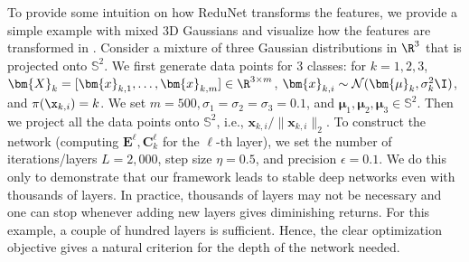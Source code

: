 \documentclass[../../book-main.tex]{subfiles}
\begin{document}
\begin{example}
To provide some intuition on how ReduNet transforms the features, we provide a simple example with mixed 3D Gaussians and visualize how the features are transformed in . 
Consider a mixture of three Gaussian distributions in $\R^{3}$ that is projected onto $\mathbb{S}^2$. We first generate data points for 3 classes: for $k=1,2,3$, $\bm{X}_{k}=[\bm{x}_{k,1}, \ldots, \bm{x}_{k,m}] \in \R^{3\times m}$, $\bm{x}_{k,i} \sim \mathcal{N}(\bm{\mu}_{k}, \sigma_{k}^{2} \I)$, and ${\pi}(\x_{k,i}) = k$.
We set $m=500, \sigma_{1}=\sigma_{2}=\sigma_{3}=0.1$, and $\bm{\mu}_{1}, \bm{\mu}_{2}, \bm{\mu}_{3} \in \mathbb{S}^2$. 
Then we project all the data points onto $\mathbb{S}^{2}$, i.e., $\bm{x}_{k,i}/\|\bm{x}_{k,i}\|_{2}$. 
To construct the network (computing $\bm{E}^{\ell}, \bm{C}^{\ell}_{k}$ for the $\ell$-th layer), we set the number of iterations/layers $L=2,000$, step size $\eta=0.5$, and precision $\epsilon=0.1$. 
We do this only to demonstrate that our framework leads to stable deep networks even with thousands of layers. 
In practice, thousands of layers may not be necessary and one can stop whenever adding new layers gives diminishing returns. 
For this example, a couple of hundred layers is sufficient. Hence, the clear optimization objective gives a natural criterion for the depth of the network needed.


\end{example}
\end{document}
